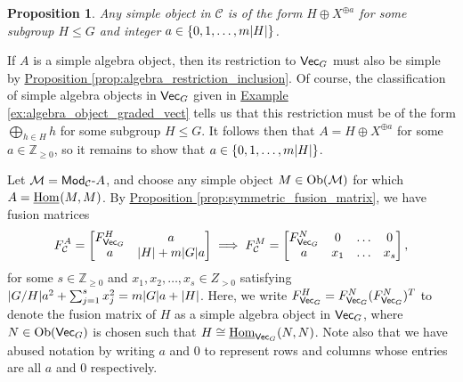 \documentclass[12pt, reqno]{amsart}
\numberwithin{equation}{section}
\theoremstyle{plainspace}
\newtheorem{proposition}[theorem]{Proposition}
\theoremstyle{definitionspace}
\theoremstyle{remarkspace}
\renewenvironment{proof}{{\noindent\textbf{Proof.}}}{\null\hfill\qedsymbol}
\DeclarePairedDelimiter{\abs}{\lvert}{\rvert}
\newcommand{\mathcat}[1]{\mathcal{#1}}
\newcommand{\Ob}{\textup{Ob}}
\newcommand{\IntHom}[2][]{
	\ifthenelse{\equal{#2}{}}
		{\underline{\textup{Hom}}_{#1}}
		{\underline{\textup{Hom}}_{#1}\!\left(#2\right)}
}
\newcommand{\textcat}[1]{\textup{\textsf{#1}}}
\newcommand{\rmodcat}[2][]{\textcat{Mod}_{#1}\textcat{-}#2}
\begin{document}
\begin{proposition}\label{prop:near-group_algebra_candidates}
Any simple object in $\mathcat{C}$ is of the form $H \oplus X^{\oplus a}$ for some subgroup $H \leq G$ and integer $a \in \{0, 1, \dots, m\abs{H}\}$.
\end{proposition}
\leavevmode\newline
\begin{proof}
\noindent If $A$ is a simple algebra object, then its restriction to $\textcat{Vec}_G$ must also be simple by \hyperref[prop:algebra_restriction_inclusion]{Proposition \ref*{prop:algebra_restriction_inclusion}}. Of course, the classification of simple algebra objects in $\textcat{Vec}_G$ given in \hyperref[ex:algebra_object_graded_vect]{Example \ref*{ex:algebra_object_graded_vect}} tells us that this restriction must be of the form $\bigoplus_{h \in H}{h}$ for some subgroup $H \leq G$. It follows then that $A = H \oplus X^{\oplus a}$ for some $a \in \mathbb{Z}_{\geq 0}$, so it remains to show that $a \in \{0, 1, \dots, m\abs{H}\}$.
\newline

\noindent Let $\mathcat{M} = \rmodcat[\mathcat{C}]{A}$, and choose any simple object $M \in \Ob(\mathcat{M})$ for which $A = \IntHom{M, M}$. By \hyperref[prop:symmetric_fusion_matrix]{Proposition \ref*{prop:symmetric_fusion_matrix}}, we have fusion matrices
\begin{align*}
\begin{split}
F_{\mathcat{C}}^A = \begin{bmatrix}
F_{\textcat{Vec}_G}^H & a \\
a & \abs{H} + m\abs{G}a
\end{bmatrix} \implies F_{\mathcat{C}}^M = \begin{bmatrix}
F_{\textcat{Vec}_G}^N & 0 & \dots & 0 \\
a & x_1 & \dots & x_s
\end{bmatrix},
\end{split}
\end{align*}
\noindent for some $s \in \mathbb{Z}_{\geq 0}$ and $x_1, x_2, \dots, x_s \in Z_{>0}$ satisfying $\abs{G/H}a^2 + \sum_{j=1}^{s}{x_j^2} = m\abs{G}a + \abs{H}$. Here, we write $F_{\textcat{Vec}_G}^H = F_{\textcat{Vec}_G}^N(F_{\textcat{Vec}_G}^N)^T$ to denote the fusion matrix of $H$ as a simple algebra object in $\textcat{Vec}_G$, where $N \in \Ob(\textcat{Vec}_G)$ is chosen such that $H \cong \IntHom[\textcat{Vec}_G]{N, N}$. Note also that we have abused notation by writing $a$ and $0$ to represent rows and columns whose entries are all $a$ and $0$ respectively.
\newline


\end{proof}
\end{document}
